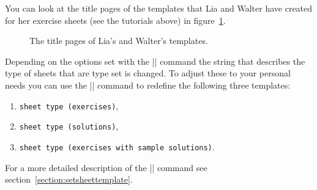 \documentclass[a4paper,fleqn]{report}
\begin{document}
\noindent You can look at the title pages of the templates that Lia
and Walter have created for her exercise sheets (see the tutorials
above) in figure~\ref{fig:template_title_pages}.

\begin{figure}[htbp]
  \centering
  \quad
  \caption{The title pages of Lia's and Walter's templates.}
  \label{fig:template_title_pages}
\end{figure}

Depending on the options set with the |\sheetconf| command the string
that describes the type of sheets that are type set is changed. To
adjust these to your personal needs you can use the
|\setsheettemplate| command to redefine the following three templates:
\begin{enumerate}
  \item \lstinline[language={}]|sheet type (exercises)|,
  \item \lstinline[language={}]|sheet type (solutions)|,
  \item \lstinline[language={}]|sheet type (exercises with sample solutions)|.
\end{enumerate}
For a more detailed description of the |\setsheettemplate| command see
section~\ref{section:setsheettemplate}.
\end{document}
